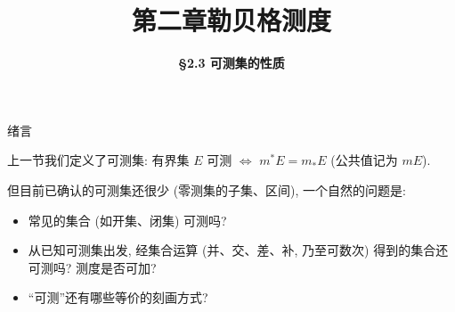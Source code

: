\everymath{\displaystyle}



\title[第二章\\
勒贝格测度]{\texorpdfstring{\LARGE \bfseries 第二章\quad 勒贝格测度}{第二章 勒贝格测度}}
\author[\S 2.3\\
可测集的性质]
{\Large \bfseries \S 2.3 可测集的性质}
\date{}





\begin{frame}

\titlepage

\end{frame}




\begin{frame}{绪言}

上一节我们定义了\alert{可测集}: 有界集 $E$ 可测 $\iff$ $m^* E = m_* E$ (公共值记为 $mE$).

\pause

但目前已确认的可测集还很少 (零测集的子集、区间), 一个自然的问题是:

\begin{question}
\begin{itemize}
\item 常见的集合 (如\alert{开集、闭集}) 可测吗?
\item 从已知可测集出发, 经\alert{集合运算} (并、交、差、补, 乃至\alert{可数}次) 得到的集合还可测吗? 测度是否可加?
\item ``可测''还有哪些等价的刻画方式?
\end{itemize}
\end{question}



\end{frame}

